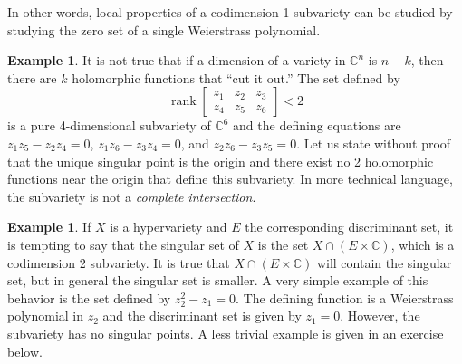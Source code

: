 \documentclass[12pt,openany]{book}
\newcommand{\C}{{\mathbb{C}}}
\newcommand{\rank}{\operatorname{rank}}
\newcommand{\myindex}[1]{#1\index{#1}}
\theoremstyle{plain}
\theoremstyle{remark}
\theoremstyle{definition}
\theoremstyle{exercise}
\theoremstyle{example}
\newtheorem{example}[thm]{Example}
\begin{document}
In other words, local properties of a codimension 1 subvariety can be
studied by studying the zero set of a single Weierstrass polynomial.

\begin{example}
It is not true that
if a dimension of a variety in $\C^n$ is $n-k$, then there are $k$
holomorphic functions that ``cut it out.''
The set defined by
\begin{equation*}
\rank
\begin{bmatrix}
z_1 & z_2 & z_3 \\
z_4 & z_5 & z_6
\end{bmatrix}
< 2
\end{equation*}
is a pure 4-dimensional subvariety of $\C^6$ and the defining equations are
$z_1z_5-z_2z_4 = 0$,
$z_1z_6-z_3z_4 = 0$, and
$z_2z_6-z_3z_5 = 0$.  Let us state without proof that the unique singular point is the origin and there exist
no 2 holomorphic functions near the origin
that define this subvariety.  In more technical
language, the subvariety is not a \emph{\myindex{complete intersection}}.
\end{example}

\begin{example}
If $X$ is a hypervariety and $E$ the corresponding discriminant set,
it is tempting to say that the singular set of $X$ is the
set $X \cap (E \times \C)$, which is a codimension 2 subvariety.  It is true that
$X \cap (E \times \C)$ will contain the singular set, but in general the
singular set is smaller.
A very simple example of this behavior is the set defined by
$z_2^2 - z_1 = 0$.  The defining function is a Weierstrass
polynomial in $z_2$ and the discriminant set is given by $z_1 = 0$.
However, the subvariety has no singular points.  A less trivial example
is given in an exercise below.
\end{example}
\end{document}
